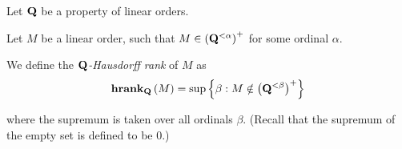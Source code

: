\begin{definition}
  Let $\mathbf{Q}$ be a property of linear orders.

  Let $M$ be a linear order, such that
  $M \in \left( {\mathbf{Q}^{< \alpha}} \right)^+$ for some ordinal $\alpha$.

  We define the \emph{$\mathbf{Q}$-Hausdorff rank} of $M$ as
  \[
    \mathbf{hrank}_{\mathbf{Q}} \left( {M} \right) = \sup \left\{ {\beta : M \notin \left( {\mathbf{Q}^{< \beta}} \right)^{+}} \right\}
  \]

  where the supremum is taken over all ordinals $\beta$.
  (Recall that the supremum of the empty set is defined to be $0$.)

\end{definition}